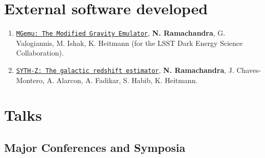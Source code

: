 \documentclass[letterpaper]{article}
\begin{document}


\section*{External software developed}


\begin{enumerate}

\item \href{https://github.com/LSSTDESC/mgemu}{\tt MGemu: The Modified Gravity Emulator}, \textbf{N. Ramachandra}, G. Valogiannis, M. Ishak, K. Heitmann (for the LSST Dark Energy Science Collaboration).

\item \href{https://github.com/nesar/MDN_phoZ}{\tt SYTH-Z: The galactic redshift estimator}, \textbf{N. Ramachandra}, J. Chaves-Montero, A. Alarcon, A. Fadikar, S. Habib, K. Heitmann.

\end{enumerate}

\section*{Talks}
\subsection*{Major Conferences and Symposia}
\end{document}
